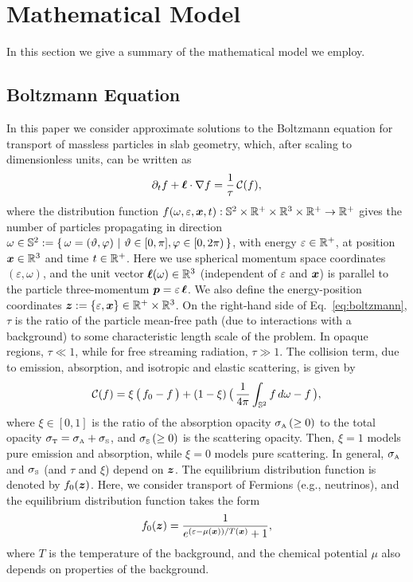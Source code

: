\section{Mathematical Model}

In this section we give a summary of the mathematical model we employ.  

\subsection{Boltzmann Equation}

In this paper we consider approximate solutions to the Boltzmann equation for transport of massless particles in slab geometry, which, after scaling to dimensionless units, can be written as
\begin{equation}
  \pd{f}{t}+\vect{\ell}\cdot\nabla f
  =\f{1}{\tau}\,\cC(f),
  \label{eq:boltzmann}
\end{equation}
where the distribution function $f(\omega,\varepsilon,\boldsymbol{x},t):\mathbb{S}^{2}\times\mathbb{R}^{+}\times\mathbb{R}^{3}\times\mathbb{R}^{+}\to\mathbb{R}^{+}$ gives the number of particles propagating in direction $\omega\in\mathbb{S}^{2}:=\{\,\omega=(\vartheta,\varphi)~|~\vartheta\in[0,\pi],\varphi\in[0,2\pi)\,\}$, with energy $\varepsilon\in\mathbb{R}^{+}$, at position $\boldsymbol{x}\in\mathbb{R}^{3}$ and time $t\in\mathbb{R}^{+}$.  
Here we use spherical momentum space coordinates $(\varepsilon,\omega)$, and the unit vector $\boldsymbol{\ell}(\omega)\in\mathbb{R}^{3}$ (independent of $\varepsilon$ and $\boldsymbol{x}$) is parallel to the particle three-momentum $\boldsymbol{p}=\varepsilon\,\boldsymbol{\ell}$.  
We also define the energy-position coordinates $\boldsymbol{z}:=\{\varepsilon,\boldsymbol{x}\}\in\mathbb{R}^{+}\times\mathbb{R}^{3}$.  
On the right-hand side of Eq.~\eqref{eq:boltzmann}, $\tau$ is the ratio of the particle mean-free path (due to interactions with a background) to some characteristic length scale of the problem.  
In opaque regions, $\tau\ll1$, while for free streaming radiation, $\tau\gg1$.  
The collision term, due to emission, absorption, and isotropic and elastic scattering, is given by
\begin{equation}
  \cC(f)=\xi\,\big(\,f_{0}-f\,\big)
  +(1-\xi)\,\big(\,\f{1}{4\pi}\int_{\bbS^{2}}f\,d\omega-f\,\big),
  \label{eq:collisionTerm}
\end{equation}
where $\xi\in[0,1]$ is the ratio of the absorption opacity $\sigma_{\mbox{\tiny A}}\,(\ge0)$ to the total opacity $\sigma_{\mbox{\tiny T}}=\sigma_{\mbox{\tiny A}}+\sigma_{\mbox{\tiny S}}$, and $\sigma_{\mbox{\tiny S}}\,(\ge0)$ is the scattering opacity.  
Then, $\xi=1$ models pure emission and absorption, while $\xi=0$ models pure scattering.  
In general, $\sigma_{\mbox{\tiny A}}$ and $\sigma_{\mbox{\tiny S}}$ (and $\tau$ and $\xi$) depend on $\boldsymbol{z}$.  
The equilibrium distribution function is denoted by $f_{0}(\boldsymbol{z})$.  
Here, we consider transport of Fermions (e.g., neutrinos), and the equilibrium distribution function takes the form
\begin{equation}
  f_{0}(\vect{z})=\f{1}{e^{(\varepsilon-\mu(\vect{x}))/T(\vect{x})}+1},  
  \label{eq:fermiDirac}
\end{equation}
where $T$ is the temperature of the background, and the chemical potential $\mu$ also depends on properties of the background.  

